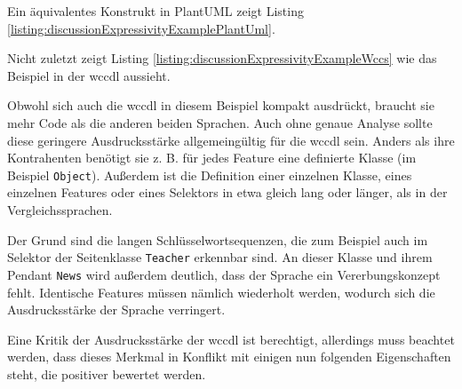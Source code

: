     

    Ein äquivalentes Konstrukt in PlantUML zeigt Listing
    \ref{listing:discussionExpressivityExamplePlantUml}.

    

    Nicht zuletzt zeigt Listing \ref{listing:discussionExpressivityExampleWccs}
    wie das Beispiel in der \gls{wccdl} aussieht.

    

    Obwohl sich auch die \gls{wccdl} in diesem Beispiel kompakt ausdrückt,
    braucht sie mehr Code als die anderen beiden Sprachen.
    Auch ohne genaue Analyse sollte diese geringere Ausdrucksstärke
    allgemeingültig für die \gls{wccdl} sein.
    Anders als ihre Kontrahenten benötigt sie z. B. für jedes Feature eine definierte Klasse
    (im Beispiel \texttt{Object}).
    Außerdem ist die Definition einer einzelnen Klasse,
    eines einzelnen Features oder eines Selektors in etwa gleich lang oder länger,
    als in der Vergleichssprachen.

    Der Grund sind die langen Schlüsselwortsequenzen,
    die zum Beispiel auch im Selektor der Seitenklasse \texttt{Teacher}
    erkennbar sind.
    An dieser Klasse und ihrem Pendant \texttt{News}
    wird außerdem deutlich, dass der Sprache ein Vererbungskonzept fehlt.
    Identische Features müssen nämlich wiederholt werden,
    wodurch sich die Ausdrucksstärke der Sprache verringert.

    Eine Kritik der Ausdrucksstärke der \gls{wccdl} ist berechtigt,
    allerdings muss beachtet werden,
    dass dieses Merkmal in Konflikt mit einigen nun folgenden
    Eigenschaften steht, die positiver bewertet werden.


